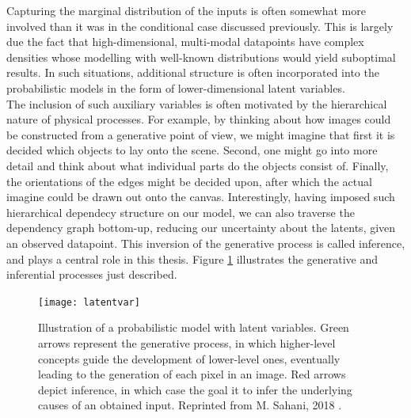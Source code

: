 \documentclass{report}
\begin{document}
\noindent Capturing the marginal distribution of the inputs is often somewhat more involved than it was in the conditional case discussed previously. This is largely due the fact that high-dimensional, multi-modal datapoints have complex densities whose modelling with well-known distributions would yield suboptimal results. In such situations, additional structure is often incorporated into the probabilistic models in the form of lower-dimensional latent variables. \\

\noindent The inclusion of such auxiliary variables is often motivated by the hierarchical nature of physical processes. For example, by thinking about how images could be constructed from a generative point of view, we might imagine that first it is decided which objects to lay onto the scene. Second, one might go into more detail and think about what individual parts do the objects consist of. Finally, the orientations of the edges might be decided upon, after which the actual imagine could be drawn out onto the canvas. Interestingly, having imposed such hierarchical dependecy structure on our model, we can also traverse the dependency graph bottom-up, reducing our uncertainty about the latents, given an observed datapoint. This inversion of the generative process is called inference, and plays a central role in this thesis. Figure \ref{fig:latent-vars} illustrates the generative and inferential processes just described. \\

\begin{figure}
\begin{center}
\texttt{[image: latentvar]}
\caption{Illustration of a probabilistic model with latent variables. Green arrows represent the generative process, in which higher-level concepts guide the development of lower-level ones, eventually leading to the generation of each pixel in an image. Red arrows depict inference, in which case the goal it to infer the underlying causes of an obtained input. Reprinted from M. Sahani, 2018 \cite{gatsby-slide}.}
\label{fig:latent-vars}
\end{center}
\end{figure}
\end{document}
